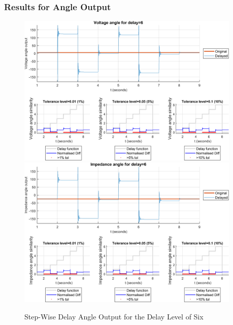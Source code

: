 \subsubsection{Results for Angle Output}


\begin{figure}
    \caption{Step-Wise Delay Angle Output for the Delay Level of Six}
    \includegraphics[width=0.95\textwidth]{PMUsim-figures/DelayOf_6/Step_vAngle.png}    
    \includegraphics[width=0.95\textwidth]{PMUsim-figures/DelayOf_6/Step_iAngle.png}    
    \label{fig:PMUsimStep_Six_Angle}
        \begin{small}
     \end{small}
\end{figure}
